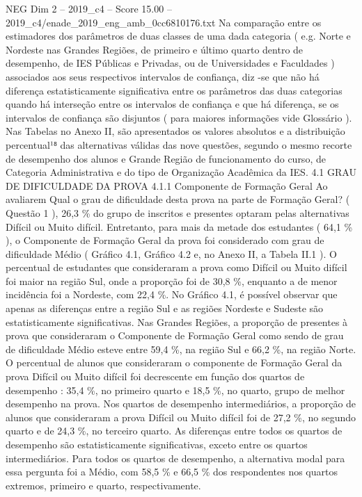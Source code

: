 \begin{textsample}{NEG Dim 2 – 2019\_c4 – Score 15.00 – 2019\_c4/enade\_2019\_eng\_amb\_0cc6810176.txt}
Na comparação entre os estimadores dos parâmetros de duas classes de uma dada categoria ( e.g.
Norte e Nordeste nas Grandes Regiões, de primeiro e último quarto dentro de desempenho, de IES Públicas e Privadas, ou de Universidades e Faculdades ) associados aos seus respectivos intervalos de confiança, diz -se que não há diferença estatisticamente significativa entre os parâmetros das duas categorias quando há interseção entre os intervalos de confiança e que há diferença, se os intervalos de confiança são disjuntos ( para maiores informações vide Glossário ).
Nas Tabelas no Anexo II, são apresentados os valores absolutos e a distribuição percentual¹⁸ das alternativas válidas das nove questões, segundo o mesmo recorte de desempenho dos alunos e Grande Região de funcionamento do curso, de Categoria Administrativa e do tipo de Organização Acadêmica da IES. 4.1 GRAU DE DIFICULDADE DA PROVA 4.1.1 Componente de Formação Geral Ao avaliarem Qual o grau de dificuldade desta prova na parte de Formação Geral? ( Questão 1 ), 26,3 \% do grupo de inscritos e presentes optaram pelas alternativas Difícil ou Muito difícil.
Entretanto, para mais da metade dos estudantes ( 64,1 \% ), o Componente de Formação Geral da prova foi considerado com grau de dificuldade Médio ( Gráfico 4.1, Gráfico 4.2 e, no Anexo II, a Tabela II.1 ).
O percentual de estudantes que consideraram a prova como Difícil ou Muito difícil foi maior na região Sul, onde a proporção foi de 30,8 \%, enquanto a de menor incidência foi a Nordeste, com 22,4 \%.
No Gráfico 4.1, é possível observar que apenas as diferenças entre a região Sul e as regiões Nordeste e Sudeste são estatisticamente significativas.
Nas Grandes Regiões, a proporção de presentes à prova que consideraram o Componente de Formação Geral como sendo de grau de dificuldade Médio esteve entre 59,4 \%, na região Sul e 66,2 \%, na região Norte.
O percentual de alunos que consideraram o componente de Formação Geral da prova Difícil ou Muito difícil foi decrescente em função dos quartos de desempenho : 35,4 \%, no primeiro quarto e 18,5 \%, no quarto, grupo de melhor desempenho na prova.
Nos quartos de desempenho intermediários, a proporção de alunos que consideraram a prova Difícil ou Muito difícil foi de 27,2 \%, no segundo quarto e de 24,3 \%, no terceiro quarto.
As diferenças entre todos os quartos de desempenho são estatisticamente significativas, exceto entre os quartos intermediários.
Para todos os quartos de desempenho, a alternativa modal para essa pergunta foi a Médio, com 58,5 \% e 66,5 \% dos respondentes nos quartos extremos, primeiro e quarto, respectivamente.

\end{textsample}
